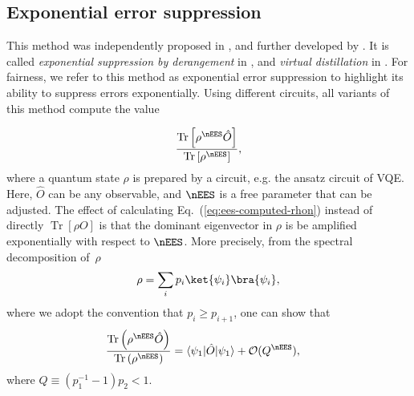 
\subsection{Exponential error suppression}
\label{sec:mit-ees}
This method was independently proposed in \citet{koczorExponentialErrorSuppression2021,hugginsVirtualDistillationQuantum2021}, and further developed by \citet{obrienErrorMitigationVerified2021, huoDualstatePurificationPractical2021, cai2021resourceefficient}. It is called \textit{exponential suppression by derangement} in \citet{koczorDominantEigenvectorNoisy2021}, and \textit{virtual distillation} in \citet{hugginsVirtualDistillationQuantum2021}.
For fairness, we refer to this method as exponential error suppression to highlight its ability to suppress errors exponentially. Using different circuits, all variants of this method compute the value

\begin{equation}
    \label{eq:ees-computed-rhon}
    \frac{\operatorname{Tr}\left[ \rho ^{\nEES} \hat{O}\right]}{\operatorname{Tr}\left[ \rho ^{\nEES}\right]},
\end{equation}
where a quantum state $\rho$ is prepared by a circuit, e.g. the ansatz circuit of VQE. Here, $\hat{O}$ can be any observable, and $\nEES$ is a free parameter that can be adjusted. The effect of calculating Eq.~(\ref{eq:ees-computed-rhon})
instead of directly $\operatorname{Tr}[\rho O]$ is that the dominant eigenvector in $\rho$ is be amplified exponentially with respect to $\nEES$. 
More precisely, from the spectral decomposition of~$\rho$
\begin{equation}
    \label{eq:ees-spectral-decomposition}
    \rho = \sum_{i} p_i \ket{\psi_i}\bra{\psi_i},
\end{equation}
where we adopt the convention that $p_i\geqslant p_{i+1}$, one can show \cite{koczorExponentialErrorSuppression2021} that
\begin{equation}
\begin{split}
    \frac{\mathrm{Tr}\left(\rho ^{\nEES} \hat{O}\right)}{\mathrm{Tr}\left( \rho ^{\nEES}\right)} 
    &= \langle \psi _{1} |\hat{O}|\psi _{1} \rangle + \mathcal{O}(Q^\nEES),
\end{split}
\end{equation}
where $Q\equiv \left(p_1^{-1} -1\right)p_2<1$.

